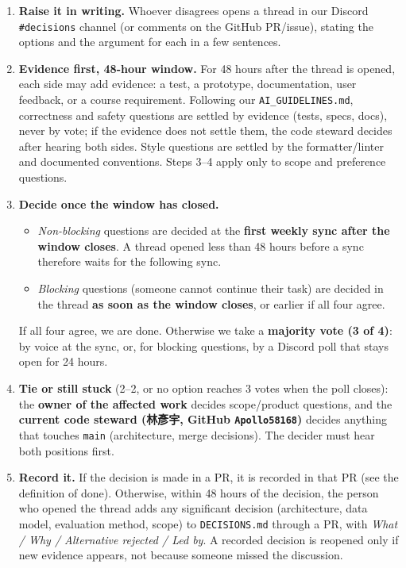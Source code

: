 \documentclass[11pt,a4paper]{article}
\newcommand{\code}[1]{\texttt{#1}}
\begin{document}
\begin{enumerate}
  \item \textbf{Raise it in writing.} Whoever disagrees opens a thread in our Discord \code{\#decisions} channel (or comments on the GitHub PR/issue), stating the options and the argument for each in a few sentences.
  \item \textbf{Evidence first, 48-hour window.} For 48 hours after the thread is opened, each side may add evidence: a test, a prototype, documentation, user feedback, or a course requirement. Following our \code{AI\_GUIDELINES.md}, correctness and safety questions are settled by evidence (tests, specs, docs), never by vote; if the evidence does not settle them, the code steward decides after hearing both sides. Style questions are settled by the formatter/linter and documented conventions. Steps 3--4 apply only to scope and preference questions.
  \item \textbf{Decide once the window has closed.}
  \begin{itemize}
    \item \emph{Non-blocking} questions are decided at the \textbf{first weekly sync after the window closes}. A thread opened less than 48 hours before a sync therefore waits for the following sync.
    \item \emph{Blocking} questions (someone cannot continue their task) are decided in the thread \textbf{as soon as the window closes}, or earlier if all four agree.
  \end{itemize}
  If all four agree, we are done. Otherwise we take a \textbf{majority vote (3 of 4)}: by voice at the sync, or, for blocking questions, by a Discord poll that stays open for 24 hours.
  \item \textbf{Tie or still stuck} (2--2, or no option reaches 3 votes when the poll closes): the \textbf{owner of the affected work} decides scope/product questions, and the \textbf{current code steward (林彥宇, GitHub \code{Apollo58168})} decides anything that touches \code{main} (architecture, merge decisions). The decider must hear both positions first.
  \item \textbf{Record it.} If the decision is made in a PR, it is recorded in that PR (see the definition of done). Otherwise, within 48 hours of the decision, the person who opened the thread adds any significant decision (architecture, data model, evaluation method, scope) to \code{DECISIONS.md} through a PR, with \emph{What / Why / Alternative rejected / Led by}. A recorded decision is reopened only if new evidence appears, not because someone missed the discussion.
\end{enumerate}
\end{document}
